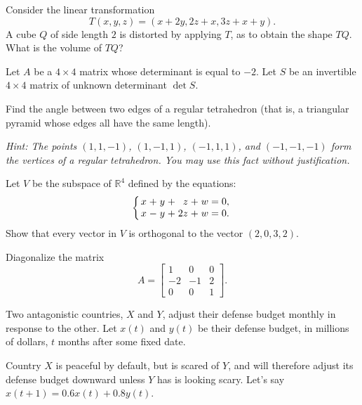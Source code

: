 \documentclass[addpoints]{exam}
\newcommand{\R}{\mathbb{R}}
\begin{document}
\begin{questions}

\question[5] Consider the linear transformation
\[T(x,y,z)=(x+2y,2z+x,3z+x+y).\]
A cube $Q$ of side length $2$ is distorted by applying $T$, as to obtain the shape $TQ$. What is the volume of $TQ$?

\question Let $A$ be a $4\times 4$ matrix whose determinant is equal to $-2$. Let $S$ be an invertible $4\times 4$ matrix of unknown determinant $\det S$.
 
\question[5] Find the angle between two edges of a regular tetrahedron (that is, a triangular pyramid whose edges all have the same length).

\textit{Hint: The points $(1,1,-1)$, $(1,-1,1)$, $(-1,1,1)$, and $(-1,-1,-1)$ form the vertices of a regular tetrahedron. You may use this fact without justification.}

\question[5] Let $V$ be the subspace of $\R^4$ defined by the equations:
\[\left\{
\arraycolsep=1.4pt
\begin{array}{rrrrrrrrrr}
x&+&y&+&z&+&w&=&0,\\
x&-&y&+&2z&+&w&=&0.
\end{array}
\right.\]
Show that every vector in $V$ is orthogonal to the vector $(2,0,3,2)$.



\question[20] Diagonalize the matrix
\[A =
\begin{bmatrix}
1 & 0 & 0 \\
-2 & -1 & 2 \\
0 & 0 & 1
\end{bmatrix}.\]

\question[20] Two antagonistic countries, $X$ and $Y$, adjust their defense budget monthly in response to the other. Let $x(t)$ and $y(t)$ be their defense budget, in millions of dollars, $t$ months after some fixed date.

Country $X$ is peaceful by default, but is scared of $Y$, and will therefore adjust its defense budget downward unless $Y$ has is looking scary. Let's say $x(t+1)=0.6 x(t) + 0.8 y(t)$.


\end{questions}
\end{document}
